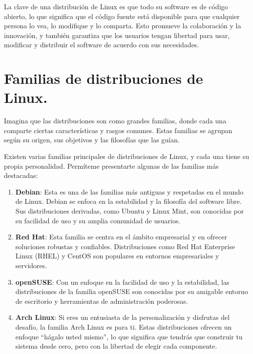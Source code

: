 \documentclass[
  jou,
  floatsintext,
  longtable,
  a4paper,
  nolmodern,
  notxfonts,
  notimes,
  colorlinks=true,linkcolor=blue,citecolor=blue,urlcolor=blue]{apa7}
\begin{document}
La clave de una distribución de Linux es que todo su software es de
código abierto, lo que significa que el código fuente está disponible
para que cualquier persona lo vea, lo modifique y lo comparta. Esto
promueve la colaboración y la innovación, y también garantiza que los
usuarios tengan libertad para usar, modificar y distribuir el software
de acuerdo con sus necesidades.

\section{Familias de distribuciones de
Linux.}\label{familias-de-distribuciones-de-linux.}

Imagina que las distribuciones son como grandes familias, donde cada una
comparte ciertas características y rasgos comunes. Estas familias se
agrupan según su origen, sus objetivos y las filosofías que las guían.

Existen varias familias principales de distribuciones de Linux, y cada
una tiene su propia personalidad. Permíteme presentarte algunas de las
familias más destacadas:

\begin{enumerate}
\def\labelenumi{\arabic{enumi}.}
\item
  \textbf{Debian}: Esta es una de las familias más antiguas y respetadas
  en el mundo de Linux. Debian se enfoca en la estabilidad y la
  filosofía del software libre. Sus distribuciones derivadas, como
  Ubuntu y Linux Mint, son conocidas por su facilidad de uso y su amplia
  comunidad de usuarios.
\item
  \textbf{Red Hat}: Esta familia se centra en el ámbito empresarial y en
  ofrecer soluciones robustas y confiables. Distribuciones como Red Hat
  Enterprise Linux (RHEL) y CentOS son populares en entornos
  empresariales y servidores.
\item
  \textbf{openSUSE}: Con un enfoque en la facilidad de uso y la
  estabilidad, las distribuciones de la familia openSUSE son conocidas
  por su amigable entorno de escritorio y herramientas de administración
  poderosas.
\item
  \textbf{Arch Linux}: Si eres un entusiasta de la personalización y
  disfrutas del desafío, la familia Arch Linux es para ti. Estas
  distribuciones ofrecen un enfoque ``hágalo usted mismo'', lo que
  significa que tendrás que construir tu sistema desde cero, pero con la
  libertad de elegir cada componente.
\end{enumerate}
\end{document}
